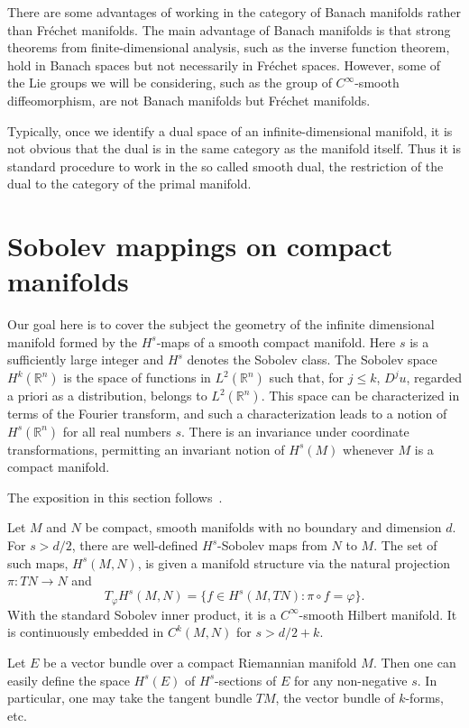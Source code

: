 \documentclass[a5paper,10pt,twoside]{article}
\newcommand{\R}{\ensuremath{\mathbb{R}}}
\theoremstyle{plain}
\theoremstyle{definition}
\theoremstyle{remark}
\begin{document}
There are some advantages of working in the category of Banach manifolds rather than Fréchet manifolds. The main advantage of Banach manifolds is that strong theorems from finite-dimensional analysis, such as the inverse function theorem, hold in Banach spaces but not necessarily in Fréchet spaces. However, some of the Lie groups we will be considering, such as the group of $C^\infty$-smooth diffeomorphism, are not Banach manifolds but Fréchet manifolds.

Typically, once we identify a dual space of an infinite-dimensional manifold, it is not obvious that the dual is in the same category as the manifold itself. Thus it is standard procedure to work in the so called smooth dual, the restriction of the dual to the category of the primal manifold.

\section{Sobolev mappings on compact manifolds}
Our goal here is to cover the subject the geometry of the infinite dimensional
manifold formed by the $H^s$-maps of a smooth compact manifold.
Here $s$ is a sufficiently large integer and  $H^s$ denotes the Sobolev class.
The Sobolev space $H^k(\R^n)$ is the space of functions in $L^2(\R^n)$ such that, for $j\leq k$, $D^ju$, regarded a priori as a distribution, belongs to $L^2(\R^n)$. This space can be
characterized in terms of the Fourier transform, and such a characterization leads to a notion of $H^s(\R^n)$ for all real numbers $s$. 
There is an invariance under coordinate transformations, permitting an invariant
notion of $H^s(M)$ whenever $M$ is a compact manifold.

The exposition in this section follows~\cite{glilikh1997}.

Let $M$ and $N$ be compact, smooth manifolds with no boundary and dimension $d$. For $s>d/2$, there are well-defined $H^s$-Sobolev maps from $N$ to $M$. The set of such maps, $H^s(M,N)$, is given a manifold structure via the natural projection $\pi: TN\to N$ and
%
\begin{equation}
T_\varphi H^s(M,N)=\{ f\in H^s(M,TN): \pi\circ f=\varphi\}.
\end{equation}
%
With the standard Sobolev inner product, it is a $C^\infty$-smooth Hilbert manifold. It is continuously embedded in $C^k(M,N)$ for $s>d/2+k.$

Let $E$ be a vector bundle over a compact Riemannian manifold
$M$. Then one can easily define the space $H^s(E)$ of $H^s$-sections of $E$ for any
non-negative $s$. In particular, one may take the tangent bundle $TM$, the vector
bundle of $k$-forms,  etc.
\end{document}
